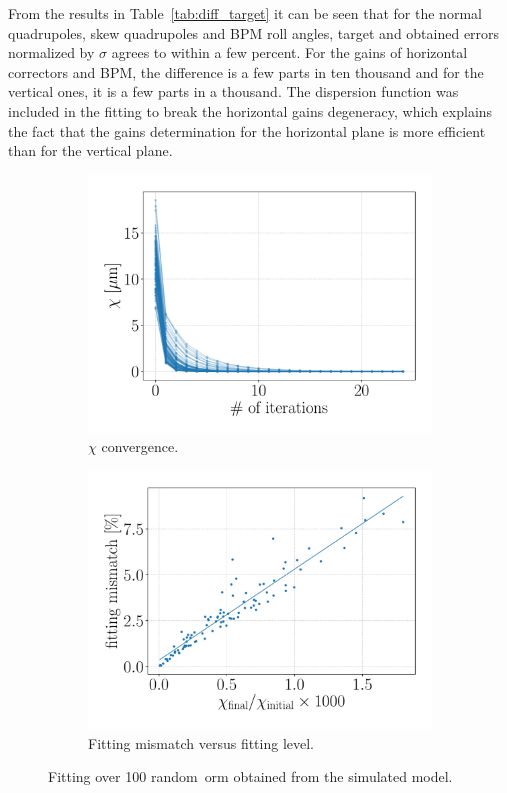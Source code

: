 From the results in Table~\ref{tab:diff_target} it can be seen that for the normal quadrupoles, skew quadrupoles and BPM roll angles, target and obtained errors normalized by $\sigma$ agrees to within a few percent. For the gains of horizontal correctors and BPM, the difference is a few parts in ten thousand and for the vertical ones, it is a few parts in a thousand. The dispersion function was included in the fitting to break the horizontal gains degeneracy, which explains the fact that the gains determination for the horizontal plane is more efficient than for the vertical plane.
\begin{figure}
\centering
\begin{subfigure}[t]{0.49\textwidth}
\includegraphics[width=1.0\textwidth]{figures/chi_seeds_grid_big.pdf}
    \caption{$\chi$ convergence.}
    \label{subfig:chi_seeds}
\end{subfigure}
 \begin{subfigure}[t]{0.49\textwidth}
\includegraphics[width=1.0\textwidth]{figures/chi_versus_score_grid_big.pdf}
    \caption{Fitting mismatch versus fitting level.}
    \label{subfig:chi_versus_score}
\end{subfigure}
\caption{Fitting over 100 random~\gls{orm} obtained from the simulated model.}
\label{fig:fitting_seeds}
\end{figure}
